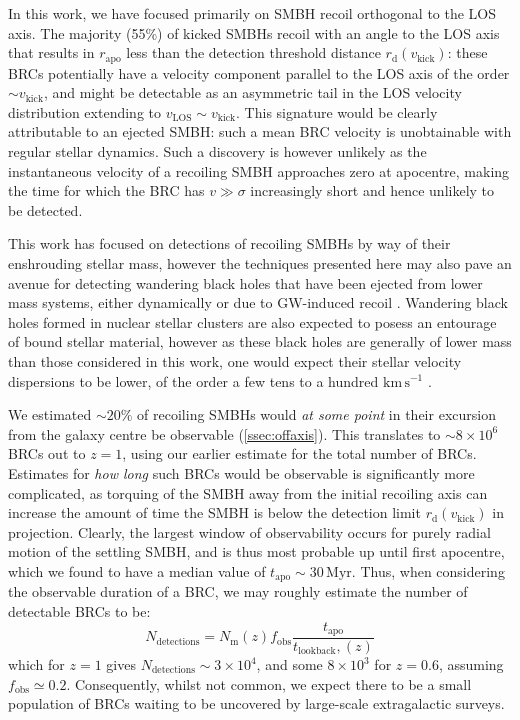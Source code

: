 \documentclass[twocolumn]{aastex631}
\newcommand{\kmps}{\ensuremath{\mathrm{km}\,\mathrm{s}^{-1}} }%
\newcommand{\rapo}{\ensuremath{r_\mathrm{apo}}}               %
\newcommand{\vk}{\ensuremath{v_\mathrm{kick}}}                %
\newcommand{\rdetect}{\ensuremath{r_\mathrm{d}(\vk)}}         %
\begin{document}
In this work, we have focused primarily on SMBH recoil orthogonal to the LOS axis.
The majority (55\%) of kicked SMBHs recoil with an angle to the LOS axis that results in $\rapo$ less than the detection threshold distance $\rdetect$: these BRCs potentially have a velocity component parallel to the LOS axis of the order $\sim\vk$, and might be detectable as an asymmetric tail in the LOS velocity distribution extending to $v_\mathrm{LOS}\sim\vk$.
This signature would be clearly attributable to an ejected SMBH: such a mean BRC velocity is unobtainable with regular stellar dynamics.
Such a discovery is however unlikely as the instantaneous velocity of a recoiling SMBH approaches zero at apocentre, making the time for which the BRC has $v\gg \sigma$ increasingly short and hence unlikely to be detected. 

This work has focused on detections of recoiling SMBHs by way of their enshrouding stellar mass, however the techniques presented here may also pave an avenue for detecting wandering black holes that have been ejected from lower mass systems, either dynamically or due to GW-induced recoil \citep[e.g.][]{rizzuto2022,rantala2024b,rantala2025}.
Wandering black holes formed in nuclear stellar clusters are also expected to posess an entourage of bound stellar material, however as these black holes are generally of lower mass than those considered in this work, one would expect their stellar velocity dispersions to be lower, of the order a few tens to a hundred $\kmps$ \citep[e.g.][]{stone2017}.

We estimated $\sim20\%$ of recoiling SMBHs would \textit{at some point} in their excursion from the galaxy centre be observable (\autoref{ssec:offaxis}).
This translates to $\sim8\times10^6$ BRCs out to $z=1$, using our earlier estimate for the total number of BRCs.
Estimates for \textit{how long} such BRCs would be observable is significantly more complicated, as torquing of the SMBH away from the initial recoiling axis can increase the amount of time the SMBH is below the detection limit $\rdetect$ in projection.
Clearly, the largest window of observability occurs for purely radial motion of the settling SMBH, and is thus most probable up until first apocentre, which we found to have a median value of $t_\mathrm{apo}\sim30\,\mathrm{Myr}$.
Thus, when considering the observable duration of a BRC, we may roughly estimate the number of detectable BRCs to be:
\begin{equation}\label{eq:numBRCs}
    N_\mathrm{detections} = N_\mathrm{m}(z) f_\mathrm{obs} \frac{t_\mathrm{apo}}{t_\mathrm{lookback},(z)}
\end{equation}
which for $z=1$ gives $N_\mathrm{detections}\sim3\times10^4$, and some $8\times10^3$ for $z=0.6$, assuming $f_\mathrm{obs}\simeq 0.2$. 
Consequently, whilst not common, we expect there to be a small population of BRCs waiting to be uncovered by large-scale extragalactic surveys.
\end{document}
